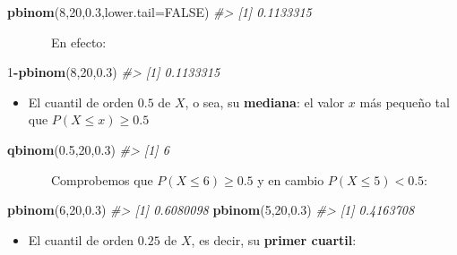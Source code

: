 \documentclass[
]{book}
\newenvironment{Shaded}{\begin{snugshade}}{\end{snugshade}}
\newcommand{\CommentTok}[1]{\textcolor[rgb]{0.56,0.35,0.01}{\textit{#1}}}
\newcommand{\DataTypeTok}[1]{\textcolor[rgb]{0.13,0.29,0.53}{#1}}
\newcommand{\DecValTok}[1]{\textcolor[rgb]{0.00,0.00,0.81}{#1}}
\newcommand{\FloatTok}[1]{\textcolor[rgb]{0.00,0.00,0.81}{#1}}
\newcommand{\KeywordTok}[1]{\textcolor[rgb]{0.13,0.29,0.53}{\textbf{#1}}}
\newcommand{\NormalTok}[1]{#1}
\newcommand{\OperatorTok}[1]{\textcolor[rgb]{0.81,0.36,0.00}{\textbf{#1}}}
\newcommand{\OtherTok}[1]{\textcolor[rgb]{0.56,0.35,0.01}{#1}}
\providecommand{\tightlist}{%
  \setlength{\itemsep}{0pt}\setlength{\parskip}{0pt}}
\theoremstyle{definition}
\theoremstyle{definition}
\theoremstyle{definition}
\theoremstyle{remark}
\begin{document}
\begin{Shaded}
\begin{Highlighting}[]
\KeywordTok{pbinom}\NormalTok{(}\DecValTok{8}\NormalTok{,}\DecValTok{20}\NormalTok{,}\FloatTok{0.3}\NormalTok{,}\DataTypeTok{lower.tail=}\OtherTok{FALSE}\NormalTok{)}
\CommentTok{\#\textgreater{} [1] 0.1133315}
\end{Highlighting}
\end{Shaded}

~~~~~~~En efecto:

\begin{Shaded}
\begin{Highlighting}[]

\DecValTok{1}\OperatorTok{{-}}\KeywordTok{pbinom}\NormalTok{(}\DecValTok{8}\NormalTok{,}\DecValTok{20}\NormalTok{,}\FloatTok{0.3}\NormalTok{)}
\CommentTok{\#\textgreater{} [1] 0.1133315}
\end{Highlighting}
\end{Shaded}

\begin{itemize}
\tightlist
\item
  El cuantil de orden \(0.5\) de \(X\), o sea, su \textbf{mediana}: el valor \(x\) más pequeño tal que \(P(X\leqslant x)\geqslant 0.5\)
\end{itemize}

\begin{Shaded}
\begin{Highlighting}[]
\KeywordTok{qbinom}\NormalTok{(}\FloatTok{0.5}\NormalTok{,}\DecValTok{20}\NormalTok{,}\FloatTok{0.3}\NormalTok{)  }
\CommentTok{\#\textgreater{} [1] 6}
\end{Highlighting}
\end{Shaded}

~~~~~~~Comprobemos que \(P(X\leqslant 6)\geqslant 0.5\) y en cambio \(P(X\leqslant 5)< 0.5\):

\begin{Shaded}
\begin{Highlighting}[]
\KeywordTok{pbinom}\NormalTok{(}\DecValTok{6}\NormalTok{,}\DecValTok{20}\NormalTok{,}\FloatTok{0.3}\NormalTok{) }
\CommentTok{\#\textgreater{} [1] 0.6080098}
\KeywordTok{pbinom}\NormalTok{(}\DecValTok{5}\NormalTok{,}\DecValTok{20}\NormalTok{,}\FloatTok{0.3}\NormalTok{) }
\CommentTok{\#\textgreater{} [1] 0.4163708}
\end{Highlighting}
\end{Shaded}

\begin{itemize}
\tightlist
\item
  El cuantil de orden \(0.25\) de \(X\), es decir, su \textbf{primer cuartil}:
\end{itemize}
\end{document}
